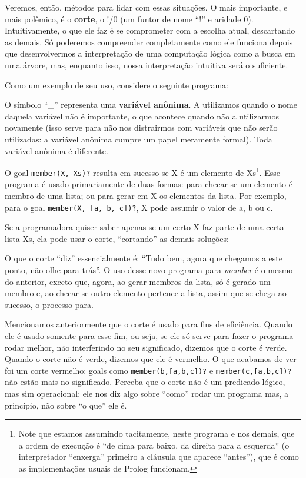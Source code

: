 \documentclass{article}
\theoremstyle{remark}
\begin{document}
Veremos, então, métodos para lidar com essas situações. O mais importante, e mais polêmico, é o \textbf{corte}, o !/0 (um funtor de nome ``!'' e aridade 0). Intuitivamente, o que ele faz é se comprometer com a escolha atual, descartando as demais. Só poderemos compreender completamente como ele funciona depois que desenvolvermos a interpretação de uma computação lógica como a busca em uma árvore, mas, enquanto isso, nossa interpretação intuitiva será o suficiente.

Como um exemplo de seu uso, considere o seguinte programa:



O símbolo ``\_'' representa uma \textbf{variável anônima}. A utilizamos quando o nome daquela variável não é importante, o que acontece quando não a utilizarmos novamente (isso serve para não nos distrairmos com variáveis que não serão utilizadas: a variável anônima cumpre um papel meramente formal). Toda variável anônima é diferente.

O goal {\tt member(X, Xs)?} resulta em sucesso se X é um elemento de Xs\footnote{Note que estamos assumindo tacitamente, neste programa e nos demais, que a ordem de execução é ``de cima para baixo, da direita para a esquerda'' (o interpretador ``enxerga'' primeiro a cláusula que aparece ``antes''), que é como as implementações usuais de Prolog funcionam.}. Esse programa é usado primariamente de duas formas: para checar se um elemento é membro de uma lista; ou para gerar em X os elementos da lista. Por exemplo, para o goal {\tt member(X, [a, b, c])?}, X pode assumir o valor de a, b ou c.

Se a programadora quiser saber apenas se um certo X faz parte de uma certa lista Xs, ela pode usar o corte, ``cortando'' as demais soluções:



O que o corte ``diz'' essencialmente é: ``Tudo bem, agora que chegamos a este ponto, não olhe para trás''. O uso desse novo programa para \textit{member} é o mesmo do anterior, exceto que, agora, ao gerar membros da lista, só é gerado um membro e, ao checar se outro elemento pertence a lista, assim que se chega ao sucesso, o processo para.

Mencionamos anteriormente que o corte é usado para fins de eficiência. Quando ele é usado somente para esse fim, ou seja, se ele só serve para fazer o programa rodar melhor, não interferindo no seu significado, dizemos que o corte é verde.
Quando o corte não é verde, dizemos que ele é vermelho. O que acabamos de ver foi um corte vermelho: goals como {\tt member(b,[a,b,c])?} e {\tt member(c,[a,b,c])?} não estão mais no significado. Perceba que o corte não é um predicado lógico, mas sim operacional: ele nos diz algo sobre ``como'' rodar um programa mas, a princípio, não sobre ``o que'' ele é.
\end{document}
